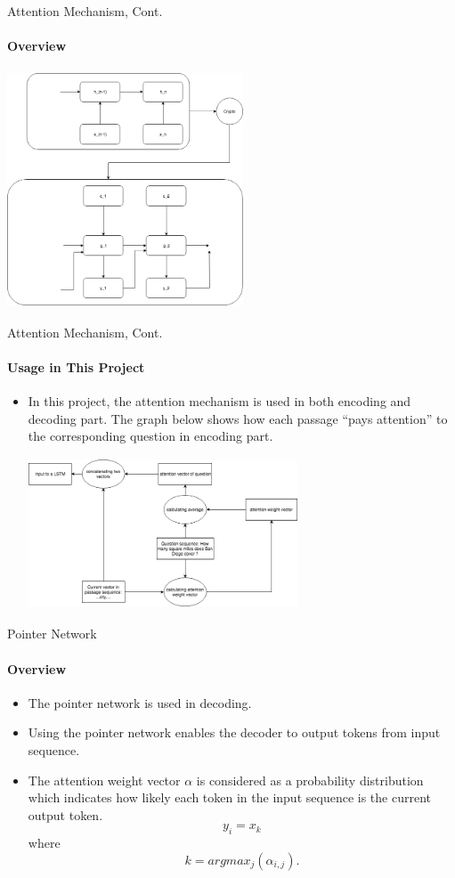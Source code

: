 \documentclass{beamer}
\begin{document}
\begin{frame}{Attention Mechanism, Cont.}\framesubtitle{Overview}
    \begin{center}
        \includegraphics[width=7cm, height=7cm]{figures/attention}
    \end{center}


\end{frame}


\begin{frame}{Attention Mechanism, Cont.}\framesubtitle{Usage in This Project}
    \begin{itemize}
        \item In this project, the attention mechanism is used in both encoding and decoding part. The graph below shows how each passage ``pays attention'' to the corresponding question in encoding part.
        \begin{center}
         \includegraphics[width=8cm, height=4.5cm]{figures/passage_question_attention.png}
        \end{center}
    \end{itemize}






\end{frame}

\begin{frame}{Pointer Network}\framesubtitle{Overview}
    \begin{itemize}
        \item The pointer network is used in decoding.
        \item Using the pointer network enables the decoder to output tokens from input sequence.
        \item The attention weight vector $\alpha$ is considered as a probability distribution which indicates how likely each token in the input sequence is the current output token.
        $$y_i = x_k$$
        where
        $$k = argmax_j(\alpha _{i,j}).$$
    \end{itemize}
\end{frame}
\end{document}
